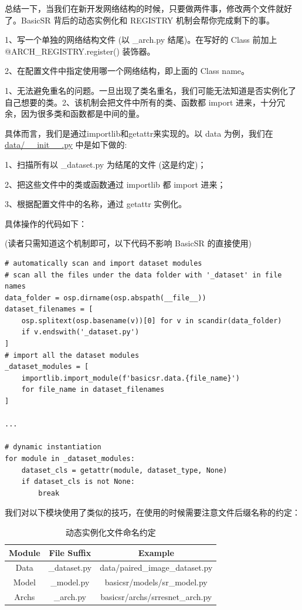 \documentclass[../main.tex]{subfiles}
\begin{document}
总结一下，当我们在新开发网络结构的时候，只要做两件事，修改两个文件就好了。BasicSR 背后的动态实例化和 REGISTRY 机制会帮你完成剩下的事。

1、写一个单独的网络结构文件 (以 \_arch.py 结尾)。在写好的 Class 前加上 @ARCH\_REGISTRY.register() 装饰器。

2、在配置文件中指定使用哪一个网络结构，即上面的 Class name。



1、无法避免重名的问题。一旦出现了类名重名，我们可能无法知道是否实例化了自己想要的类。2、该机制会把文件中所有的类、函数都 import 进来，十分冗余，因为很多类和函数都是中间的量。

具体而言，我们是通过importlib和getattr来实现的。以 data 为例，我们在 \href{https://github.com/XPixelGroup/BasicSR/blob/master/basicsr/data/__init__.py}{data/\_\_init\_\_.py} 中是如下做的:

1、扫描所有以 \_dataset.py 为结尾的文件 (这是约定)；

2、把这些文件中的类或函数通过 importlib 都 import 进来；

3、根据配置文件中的名称，通过 getattr 实例化。

具体操作的代码如下：

(读者只需知道这个机制即可，以下代码不影响 BasicSR 的直接使用)
\begin{verbatim}
# automatically scan and import dataset modules
# scan all the files under the data folder with '_dataset' in file names
data_folder = osp.dirname(osp.abspath(__file__))
dataset_filenames = [
    osp.splitext(osp.basename(v))[0] for v in scandir(data_folder)
    if v.endswith('_dataset.py')
]
# import all the dataset modules
_dataset_modules = [
    importlib.import_module(f'basicsr.data.{file_name}')
    for file_name in dataset_filenames
]

...

# dynamic instantiation
for module in _dataset_modules:
    dataset_cls = getattr(module, dataset_type, None)
    if dataset_cls is not None:
        break
\end{verbatim}

我们对以下模块使用了类似的技巧，在使用的时候需要注意文件后缀名称的约定：
\begin{table}[h]
\centering
\begin{tabular}{|c|c|c|}
\hline
\textbf{Module} & \textbf{File Suffix} & \textbf{Example} \\ \hline
Data & \_dataset.py & data/paired\_image\_dataset.py \\ \hline
Model & \_model.py & basicsr/models/sr\_model.py \\ \hline
Archs & \_arch.py & basicsr/archs/srresnet\_arch.py \\ \hline
\end{tabular}
\caption{动态实例化文件命名约定}
\end{table}
\end{document}
